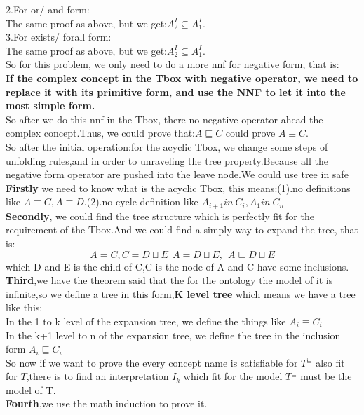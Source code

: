 \documentclass{article}
\begin{document}
    2.For or/ and form:\\
    The same proof as above, but we get:$A_2^I \subseteq A_1^I$.\\
    3.For exists/ forall form:\\
    The same proof as above, but we get:$A_2^I \subseteq A_1^I$.\\
    So for this problem, we only need to do a more nnf for negative form, that is:\\
    \textbf{If the complex concept in the Tbox with negative operator, we need to replace it with its primitive form, and use the NNF to let it into the most simple form.}\\
    So after we do this nnf in the Tbox, there no negative operator ahead the complex concept.Thus, we could prove that:$A \sqsubseteq C$ could prove $A \equiv C$.\\
    So after the initial operation:for the acyclic Tbox, we change some steps of unfolding rules,and in order to unraveling the tree property.Because all the negative form operator are pushed into the leave node.We could use tree in safe\\ 
    \textbf{Firstly} we need to know what is the acyclic Tbox, this means:(1).no definitions like $A\equiv C,A\equiv D$.(2).no cycle definition like $A_{i+1} in\ C_i,A_1 in\ C_n$\\
    \textbf{Secondly}, we could find the tree structure which is perfectly fit for the requirement of the Tbox.And we could find a simply way to expand the tree, that is:
    \[
        A = C,C = D \sqcup E \ \ A = D \sqcup E,\ \ A \sqsubseteq D \sqcup E    
    \]
    which D and E is the child of C,C is the node of A and C have some inclusions.\\
    \textbf{Third},we have the theorem said that the for the ontology the model of it is infinite,so we define a tree in this form,\textbf{K level tree} which means we have a tree like this:\\
    In the 1 to k level of the expansion tree, we define the things like $A_i \equiv C_i$\\
    In the k+1 level to n of the expansion tree, we define the tree in the inclusion form $A_i \sqsubseteq C_i$\\
    So now if we want to prove the every concept name is satisfiable for $T^{\sqsubseteq}$ also fit for $T$,there is to find an interpretation $I_k$ which fit for the model $T^{\sqsubseteq}$ must be the model of T.\\
    \textbf{Fourth},we use the math induction to prove it.\\
\end{document}
